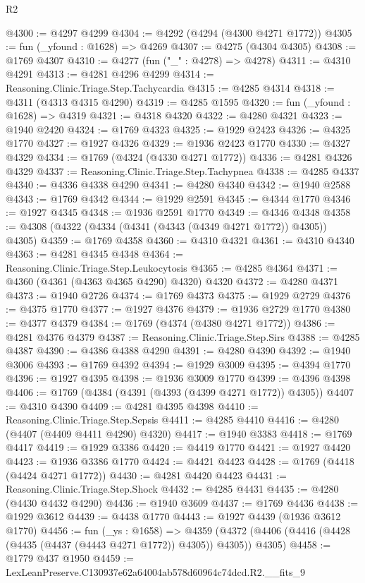\begin{lexlean}{R2}
\begin{coremodule}
@4300 := @4297 @4299
@4304 := @4292 (@4294 (@4300 @4271 @1772))
@4305 := fun (_yfound : @1628) => @4269
@4307 := @4275 (@4304 @4305)
@4308 := @1769 @4307
@4310 := @4277 (fun ("_" : @4278) => @4278)
@4311 := @4310 @4291
@4313 := @4281 @4296 @4299
@4314 := Reasoning.Clinic.Triage.Step.Tachycardia
@4315 := @4285 @4314
@4318 := @4311 (@4313 @4315 @4290)
@4319 := @4285 @1595
@4320 := fun (_yfound : @1628) => @4319
@4321 := @4318 @4320
@4322 := @4280 @4321
@4323 := @1940 @2420
@4324 := @1769 @4323
@4325 := @1929 @2423
@4326 := @4325 @1770
@4327 := @1927 @4326
@4329 := @1936 @2423 @1770
@4330 := @4327 @4329
@4334 := @1769 (@4324 (@4330 @4271 @1772))
@4336 := @4281 @4326 @4329
@4337 := Reasoning.Clinic.Triage.Step.Tachypnea
@4338 := @4285 @4337
@4340 := @4336 @4338 @4290
@4341 := @4280 @4340
@4342 := @1940 @2588
@4343 := @1769 @4342
@4344 := @1929 @2591
@4345 := @4344 @1770
@4346 := @1927 @4345
@4348 := @1936 @2591 @1770
@4349 := @4346 @4348
@4358 := @4308 (@4322 (@4334 (@4341 (@4343 (@4349 @4271 @1772)) @4305)) @4305)
@4359 := @1769 @4358
@4360 := @4310 @4321
@4361 := @4310 @4340
@4363 := @4281 @4345 @4348
@4364 := Reasoning.Clinic.Triage.Step.Leukocytosis
@4365 := @4285 @4364
@4371 := @4360 (@4361 (@4363 @4365 @4290) @4320) @4320
@4372 := @4280 @4371
@4373 := @1940 @2726
@4374 := @1769 @4373
@4375 := @1929 @2729
@4376 := @4375 @1770
@4377 := @1927 @4376
@4379 := @1936 @2729 @1770
@4380 := @4377 @4379
@4384 := @1769 (@4374 (@4380 @4271 @1772))
@4386 := @4281 @4376 @4379
@4387 := Reasoning.Clinic.Triage.Step.Sirs
@4388 := @4285 @4387
@4390 := @4386 @4388 @4290
@4391 := @4280 @4390
@4392 := @1940 @3006
@4393 := @1769 @4392
@4394 := @1929 @3009
@4395 := @4394 @1770
@4396 := @1927 @4395
@4398 := @1936 @3009 @1770
@4399 := @4396 @4398
@4406 := @1769 (@4384 (@4391 (@4393 (@4399 @4271 @1772)) @4305))
@4407 := @4310 @4390
@4409 := @4281 @4395 @4398
@4410 := Reasoning.Clinic.Triage.Step.Sepsis
@4411 := @4285 @4410
@4416 := @4280 (@4407 (@4409 @4411 @4290) @4320)
@4417 := @1940 @3383
@4418 := @1769 @4417
@4419 := @1929 @3386
@4420 := @4419 @1770
@4421 := @1927 @4420
@4423 := @1936 @3386 @1770
@4424 := @4421 @4423
@4428 := @1769 (@4418 (@4424 @4271 @1772))
@4430 := @4281 @4420 @4423
@4431 := Reasoning.Clinic.Triage.Step.Shock
@4432 := @4285 @4431
@4435 := @4280 (@4430 @4432 @4290)
@4436 := @1940 @3609
@4437 := @1769 @4436
@4438 := @1929 @3612
@4439 := @4438 @1770
@4443 := @1927 @4439 (@1936 @3612 @1770)
@4456 := fun (_ys : @1658) =>
  @4359 (@4372 (@4406 (@4416 (@4428 (@4435 (@4437 (@4443 @4271 @1772)) @4305)) @4305)) @4305)
@4458 := @1779 @437 @1950
@4459 := LexLeanPreserve.C130937e62a64004ab578d60964c74dcd.R2.__fits_9

\end{coremodule}
\end{lexlean}
